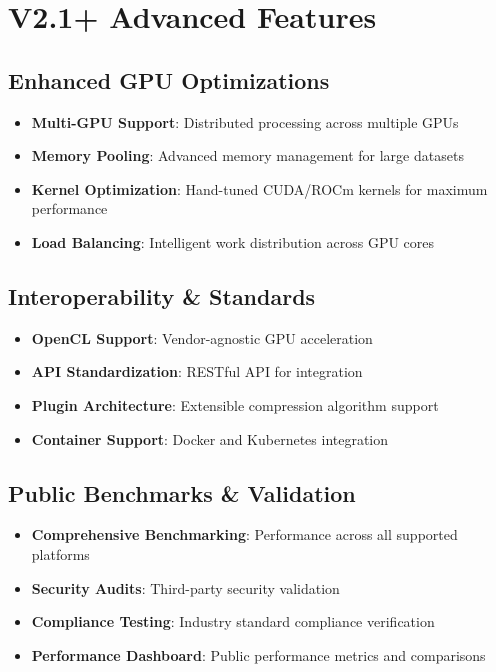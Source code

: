 \documentclass[12pt,a4paper]{article}
\begin{document}
\section{V2.1+ Advanced Features}

\subsection{Enhanced GPU Optimizations}
\begin{itemize}
    \item \textbf{Multi-GPU Support}: Distributed processing across multiple GPUs
    \item \textbf{Memory Pooling}: Advanced memory management for large datasets
    \item \textbf{Kernel Optimization}: Hand-tuned CUDA/ROCm kernels for maximum performance
    \item \textbf{Load Balancing}: Intelligent work distribution across GPU cores
\end{itemize}

\subsection{Interoperability \& Standards}
\begin{itemize}
    \item \textbf{OpenCL Support}: Vendor-agnostic GPU acceleration
    \item \textbf{API Standardization}: RESTful API for integration
    \item \textbf{Plugin Architecture}: Extensible compression algorithm support
    \item \textbf{Container Support}: Docker and Kubernetes integration
\end{itemize}

\subsection{Public Benchmarks \& Validation}
\begin{itemize}
    \item \textbf{Comprehensive Benchmarking}: Performance across all supported platforms
    \item \textbf{Security Audits}: Third-party security validation
    \item \textbf{Compliance Testing}: Industry standard compliance verification
    \item \textbf{Performance Dashboard}: Public performance metrics and comparisons
\end{itemize}
\end{document}
